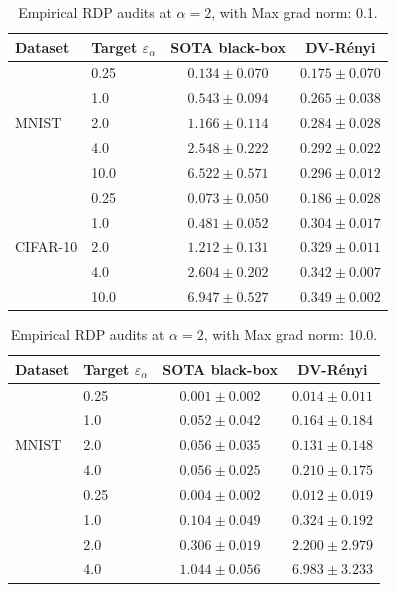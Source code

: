 \documentclass{article}
\theoremstyle{plain}
\theoremstyle{definition}
\theoremstyle{remark}
\begin{document}
\begin{table}[t]
\centering
\caption{Empirical RDP audits at $\alpha=2$, with Max grad norm: 0.1.}
\label{tab:alpha2-0.1}
\begin{tabular}{llcc}
\toprule
Dataset & Target $\varepsilon_\alpha$ & SOTA black-box \cite{muthu2024nearly} & DV-R\'enyi \\
\midrule
\multirow{5}{*}{MNIST} & 0.25 & $0.134 \pm 0.070$ & $\mathbf{0.175} \pm 0.070$ \\
 & 1.0 & $\mathbf{0.543} \pm 0.094$ & $0.265 \pm 0.038$ \\
 & 2.0 & $\mathbf{1.166} \pm 0.114$ & $0.284 \pm 0.028$ \\
 & 4.0 & $\mathbf{2.548} \pm 0.222$ & $0.292 \pm 0.022$ \\
 & 10.0 & $\mathbf{6.522} \pm 0.571$ & $0.296 \pm 0.012$ \\
\midrule
\multirow{5}{*}{CIFAR-10} & 0.25 & $0.073 \pm 0.050$ & $\mathbf{0.186} \pm 0.028$ \\
 & 1.0 & $\mathbf{0.481} \pm 0.052$ & $0.304 \pm 0.017$ \\
 & 2.0 & $\mathbf{1.212} \pm 0.131$ & $0.329 \pm 0.011$ \\
 & 4.0 & $\mathbf{2.604} \pm 0.202$ & $0.342 \pm 0.007$ \\
 & 10.0 & $\mathbf{6.947} \pm 0.527$ & $0.349 \pm 0.002$ \\
\bottomrule
\end{tabular}
\end{table}

\begin{table}[t]
\centering
\caption{Empirical RDP audits at $\alpha=2$, with Max grad norm: 10.0.}
\label{tab:alpha2-10.0}
\begin{tabular}{llcc}
\toprule
Dataset & Target $\varepsilon_\alpha$ & SOTA black-box \cite{muthu2024nearly} & DV-R\'enyi \\
\midrule
\multirow{5}{*}{MNIST} & 0.25 & $0.001 \pm 0.002$ & $\mathbf{0.014} \pm 0.011$ \\
 & 1.0 & $0.052 \pm 0.042$ & $\mathbf{0.164} \pm 0.184$ \\
 & 2.0 & $0.056 \pm 0.035$ & $\mathbf{0.131} \pm 0.148$ \\
 & 4.0 & $0.056 \pm 0.025$ & $\mathbf{0.210} \pm 0.175$  \\
\midrule
\multirow{5}{*}{CIFAR-10} & 0.25 & $0.004 \pm 0.002$ & $\mathbf{0.012} \pm 0.019$ \\
 & 1.0 & $0.104 \pm 0.049$ & $\mathbf{0.324} \pm 0.192$ \\
 & 2.0 & $0.306 \pm 0.019$ & $\mathbf{2.200} \pm 2.979$ \\
 & 4.0 & $1.044 \pm 0.056$ & $\mathbf{6.983} \pm 3.233$ \\
\bottomrule
\end{tabular}
\end{table}
\end{document}
